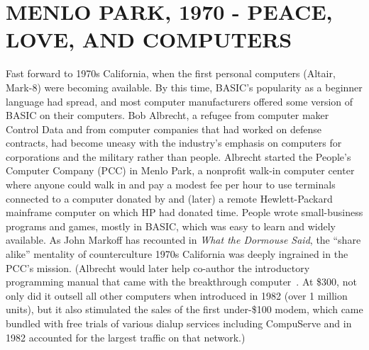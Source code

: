 
\section{MENLO PARK, 1970 - PEACE, LOVE, AND COMPUTERS}





Fast forward to 1970s California, when the first personal computers
(Altair, Mark-8) were becoming available.
By this time, BASIC's popularity as a beginner language had spread,
and most computer manufacturers offered some version of BASIC on their
computers.
Bob Albrecht, a refugee from computer maker Control Data and from
computer companies that had worked on defense contracts, had become
uneasy with the industry's emphasis on computers for corporations and
the military rather than people.
Albrecht started the People's Computer Company (PCC) in Menlo Park, a
nonprofit walk-in computer center where anyone could walk in and pay
a modest fee per hour to use terminals connected to a  computer donated by
 and (later) a remote Hewlett-Packard
mainframe computer on which HP had donated time.
People wrote small-business programs and games, mostly in BASIC, which
was easy to learn and widely available.
As John Markoff has recounted in \emph{What the Dormouse Said}, the
``share alike'' mentality of counterculture 1970s California was
deeply ingrained in the PCC's mission.
(Albrecht would later help co-author the introductory programming manual
that came with the breakthrough 
computer~\cite{commodore}.  At \$300, not only did it outsell all other
computers when introduced in 1982 (over 1 million units), but it also
stimulated the sales of the first under-\$100 modem, which came bundled
with free trials of various dialup services including CompuServe and in
1982 accounted for the largest traffic on that network.)


